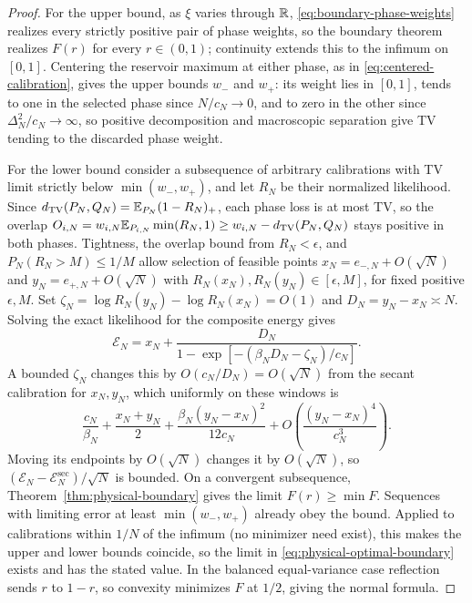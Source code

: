 \begin{proof}
For the upper bound, as $\xi$ varies through $\mathbb R$,
\eqref{eq:boundary-phase-weights} realizes every strictly positive
pair of phase weights, so the boundary theorem realizes $F(r)$ for
every $r\in(0,1)$; continuity extends this to the infimum on $[0,1]$.
Centering the reservoir maximum at either phase, as in
\eqref{eq:centered-calibration}, gives the upper bounds $w_-$ and
$w_+$: its weight lies in $[0,1]$, tends to one in the selected phase
since $N/c_N\to0$, and to zero in the other since
$\Delta_N^2/c_N\to\infty$, so positive decomposition and macroscopic
separation give TV tending to the discarded phase weight.

For the lower bound consider a subsequence of arbitrary calibrations
with TV limit strictly below $\min(w_-,w_+)$, and let $R_N$ be their
normalized likelihood. Since $d_{\mathrm{TV}}(P_N,Q_N)=\mathbb E_{P_N}(1-R_N)_+$, each
phase loss is at most TV, so the overlap
$O_{i,N}=w_{i,N}\mathbb E_{P_{i,N}}\min(R_N,1)\ge w_{i,N}-d_{\mathrm{TV}}(P_N,Q_N)$
stays positive in both phases.
Tightness, the overlap bound from $R_N<\epsilon$, and
$P_N(R_N>M)\le1/M$ allow selection of feasible points
$x_N=e_{-,N}+O(\sqrt N)$ and $y_N=e_{+,N}+O(\sqrt N)$ with
$R_N(x_N),R_N(y_N)\in[\epsilon,M]$, for fixed positive $\epsilon,M$.
Set $\zeta_N=\log R_N(y_N)-\log R_N(x_N)=O(1)$ and
$D_N=y_N-x_N\asymp N$. Solving the exact likelihood for the composite
energy gives
\begin{equation}
 \mathcal E_N=x_N+
 \frac{D_N}{1-\exp[-(\beta_ND_N-\zeta_N)/c_N]}.
 \label{eq:boundary-overlap-calibration}
\end{equation}
A bounded $\zeta_N$ changes this by $O(c_N/D_N)=O(\sqrt N)$ from
the secant calibration for $x_N,y_N$, which uniformly on these windows
is
\[
 \frac{c_N}{\beta_N}+\frac{x_N+y_N}{2}
 +\frac{\beta_N(y_N-x_N)^2}{12c_N}
 +O\!\left(\frac{(y_N-x_N)^4}{c_N^3}\right).
\]
Moving its endpoints by $O(\sqrt N)$ changes it by $O(\sqrt N)$, so
$(\mathcal E_N-\mathcal E_N^{\mathrm{sec}})/\sqrt N$ is bounded.
On a convergent subsequence, Theorem~\ref{thm:physical-boundary}
gives the limit $F(r)\ge\min F$. Sequences with limiting error at
least $\min(w_-,w_+)$ already obey the bound. Applied to calibrations
within $1/N$ of the infimum (no minimizer need exist), this makes the
upper and lower bounds coincide, so the limit in
\eqref{eq:physical-optimal-boundary} exists and has the stated value.
In the balanced equal-variance case reflection sends $r$ to $1-r$,
so convexity minimizes $F$ at $1/2$, giving the normal formula.
\end{proof}

